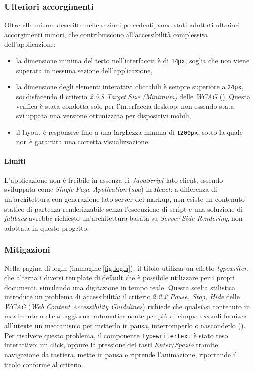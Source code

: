 \subsubsection{Ulteriori accorgimenti}
Oltre alle misure descritte nelle sezioni precedenti, sono stati adottati ulteriori accorgimenti minori, che contribuiscono all'accessibilità complessiva dell'applicazione:

\begin{itemize}
    \item la dimensione minima del testo nell'interfaccia è di \texttt{14px}, soglia che non viene superata in nessuna sezione dell'applicazione,
    \item la dimensione degli elementi interattivi cliccabili è sempre superiore a \texttt{24px}, soddisfacendo il criterio \emph{2.5.8 Target Size (Minimum)} delle \emph{WCAG} (\cite{site:wcag258}). Questa verifica è stata condotta solo per l'interfaccia desktop, non essendo stata sviluppata una versione ottimizzata per dispositivi mobili,
    \item il layout è responsive fino a una larghezza minima di \texttt{1200px}, sotto la quale non è garantita una corretta visualizzazione.
\end{itemize}

\paragraph{Limiti}
L'applicazione non è fruibile in assenza di \emph{JavaScript} lato client, essendo sviluppata come \emph{Single Page Application} (\emph{\gls{spa}\glsfirstoccur}) in \emph{React}: a differenza di un'architettura con generazione lato server del markup, non esiste un contenuto statico di partenza renderizzabile senza l'esecuzione di script e una soluzione di \emph{fallback} avrebbe richiesto un'architettura basata su \emph{Server-Side Rendering}, non adottata in questo progetto.

\subsubsection{Mitigazioni}
\label{subsubsection:mitigazioni}
Nella pagina di login (immagine \ref{fig:login}), il titolo utilizza un effetto \emph{typewriter}, che alterna i diversi template di default che è possibile utilizzare per i propri documenti, simulando una digitazione in tempo reale. Questa scelta stilistica introduce un problema di accessibilità: il criterio \emph{2.2.2 Pause, Stop, Hide} delle \emph{WCAG} (\emph{Web Content Accessibility Guidelines}) richiede che qualsiasi contenuto in movimento o che si aggiorna automaticamente per più di cinque secondi fornisca all'utente un meccanismo per metterlo in pausa, interromperlo o nasconderlo (\cite{site:wcag222}). Per risolvere questo problema, il componente \texttt{TypewriterText} è stato reso interattivo: un click, oppure la pressione dei tasti \emph{Enter}/\emph{Spazio} tramite navigazione da tastiera, mette in pausa o riprende l'animazione, riportando il titolo conforme al criterio.\\

